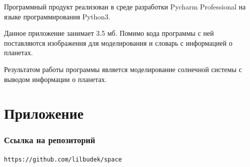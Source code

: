 \documentclass[14pt, oneside]{altsu-report}
\begin{document}
Программный продукт реализован в среде разработки Pycharm Professional на языке программирования Python3. 

Данное приложение занимает 3.5 мб. Помимо кода программы с ней поставляются изображения для моделирования и словарь с информацией о планетах. 

Результатом работы программы является моделирование солнечной системы с выводом информации о планетах.



\newpage
{}
\printbibliography[title={Список использованной литературы}]

\chapter*{Приложение}
\subsection*{Ссылка на репозиторий}
\texttt{https://github.com/lilbudek/space}
\end{document}
